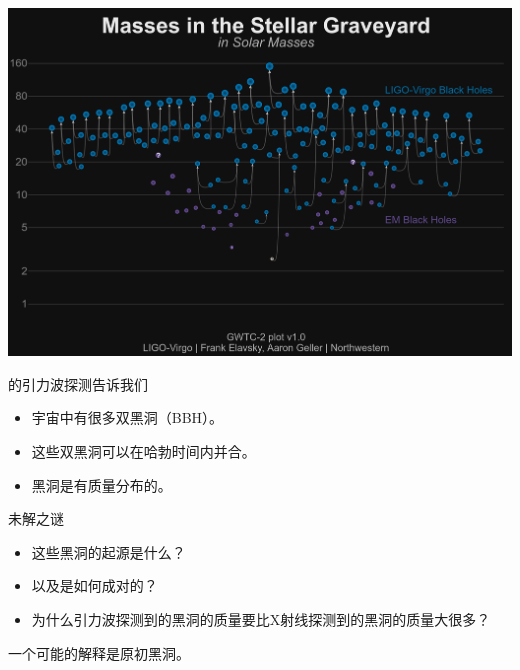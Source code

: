 \documentclass[xcolor={svgnames},compress]{beamer}
\let\olditem\item
\renewcommand{\item}{%
    \olditem\vspace{\fill}}
\begin{document}
\subsection{}
\begin{frame}{}
    \centering
    \includegraphics[width=\textwidth]{./pic/Masses_of_Dead_Stars_LIGO_Virgo}
\end{frame}


\begin{frame}{}
    \begin{block}{\lvc 的引力波探测告诉我们}
        \begin{itemize}
            \vspace{2mm}
            \item 宇宙中有很多双黑洞（BBH）。
            \item 这些双黑洞可以在哈勃时间内并合。
            \item 黑洞是有质量分布的。 
        \end{itemize}
    \end{block}
    \begin{alertblock}{未解之谜}
        \begin{itemize}
            \vspace{2mm}
            \item 这些黑洞的起源是什么？
            \item 以及是如何成对的？
            \item 为什么引力波探测到的黑洞的质量要比X射线探测到的黑洞的质量大很多？
        \end{itemize}
    \end{alertblock}
\centering
一个可能的解释是原初黑洞。
\end{frame}
\end{document}
